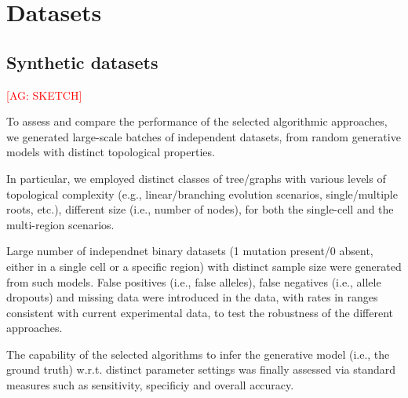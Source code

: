 \documentclass{article}
\begin{document}
\section{Datasets}

\subsection{Synthetic datasets}
\textcolor{red}{[AG: SKETCH]}

To assess and compare the performance of the selected algorithmic approaches, we generated large-scale batches of independent datasets, from random generative models with distinct topological properties. 

In particular, we employed distinct classes of tree/graphs with various levels of topological complexity (e.g., linear/branching evolution scenarios, single/multiple roots, etc.), different size (i.e., number of nodes), for both the single-cell and the multi-region scenarios. 

Large number of independnet binary datasets (1 mutation present/0 absent, either in a single cell or a specific region) with distinct sample size were generated from such models. 
False positives (i.e., false alleles), false negatives (i.e., allele dropouts) and missing data were introduced in the data, with rates in ranges consistent with current experimental data, to test the robustness of the different approaches. 

The capability of the selected algorithms to infer the generative model (i.e., the ground truth) w.r.t. distinct parameter settings was finally assessed via standard measures such as sensitivity, specificiy and overall accuracy. 



\end{document}
